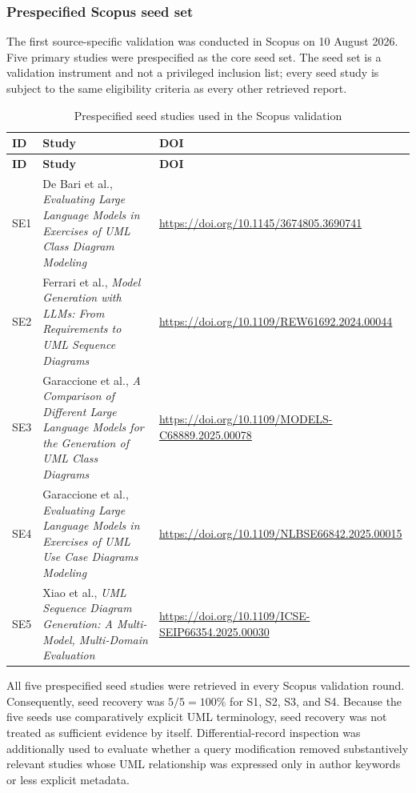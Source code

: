 \subsubsection{Prespecified Scopus seed set}

The first source-specific validation was conducted in Scopus on 10 August 2026.
Five primary studies were prespecified as the core seed set. The seed set is a
validation instrument and not a privileged inclusion list; every seed study is
subject to the same eligibility criteria as every other retrieved report.

\begin{longtable}{p{} p{} p{}}
\caption{Prespecified seed studies used in the Scopus validation}
\label{tab:scopus_seed_set}\\
\toprule
\textbf{ID} & \textbf{Study} & \textbf{DOI} \\
\midrule
\endfirsthead
\toprule
\textbf{ID} & \textbf{Study} & \textbf{DOI} \\
\midrule
\endhead
SE1 & De Bari et al., \emph{Evaluating Large Language Models in Exercises of UML Class Diagram Modeling} \cite{DeBari2024UML} & \url{https://doi.org/10.1145/3674805.3690741} \\
SE2 & Ferrari et al., \emph{Model Generation with LLMs: From Requirements to UML Sequence Diagrams} \cite{Ferrari2024Sequence} & \url{https://doi.org/10.1109/REW61692.2024.00044} \\
SE3 & Garaccione et al., \emph{A Comparison of Different Large Language Models for the Generation of UML Class Diagrams} \cite{Garaccione2025Class} & \url{https://doi.org/10.1109/MODELS-C68889.2025.00078} \\
SE4 & Garaccione et al., \emph{Evaluating Large Language Models in Exercises of UML Use Case Diagrams Modeling} \cite{Garaccione2025UseCase} & \url{https://doi.org/10.1109/NLBSE66842.2025.00015} \\
SE5 & Xiao et al., \emph{UML Sequence Diagram Generation: A Multi-Model, Multi-Domain Evaluation} \cite{Xiao2025Sequence} & \url{https://doi.org/10.1109/ICSE-SEIP66354.2025.00030} \\
\bottomrule
\end{longtable}

All five prespecified seed studies were retrieved in every Scopus validation
round. Consequently, seed recovery was \(5/5=100\%\) for S1, S2, S3, and S4.
Because the five seeds use comparatively explicit UML terminology, seed
recovery was not treated as sufficient evidence by itself. Differential-record
inspection was additionally used to evaluate whether a query modification
removed substantively relevant studies whose UML relationship was expressed
only in author keywords or less explicit metadata.


